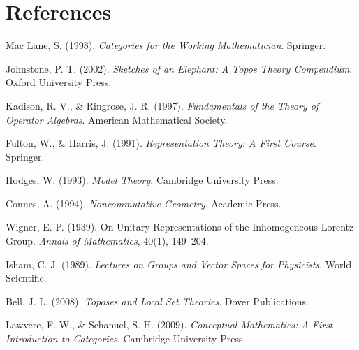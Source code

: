 \documentclass[12pt]{article}
\begin{document}
\section*{References}

\begin{thebibliography}{10}

Mac Lane, S. (1998). \textit{Categories for the Working Mathematician}. Springer.

Johnstone, P. T. (2002). \textit{Sketches of an Elephant: A Topos Theory Compendium}. Oxford University Press.

Kadison, R. V., \& Ringrose, J. R. (1997). \textit{Fundamentals of the Theory of Operator Algebras}. American Mathematical Society.

Fulton, W., \& Harris, J. (1991). \textit{Representation Theory: A First Course}. Springer.

Hodges, W. (1993). \textit{Model Theory}. Cambridge University Press.

Connes, A. (1994). \textit{Noncommutative Geometry}. Academic Press.

Wigner, E. P. (1939). On Unitary Representations of the Inhomogeneous Lorentz Group. \textit{Annals of Mathematics}, 40(1), 149–204.

Isham, C. J. (1989). \textit{Lectures on Groups and Vector Spaces for Physicists}. World Scientific.

Bell, J. L. (2008). \textit{Toposes and Local Set Theories}. Dover Publications.

Lawvere, F. W., \& Schanuel, S. H. (2009). \textit{Conceptual Mathematics: A First Introduction to Categories}. Cambridge University Press.

\end{thebibliography}
\end{document}
